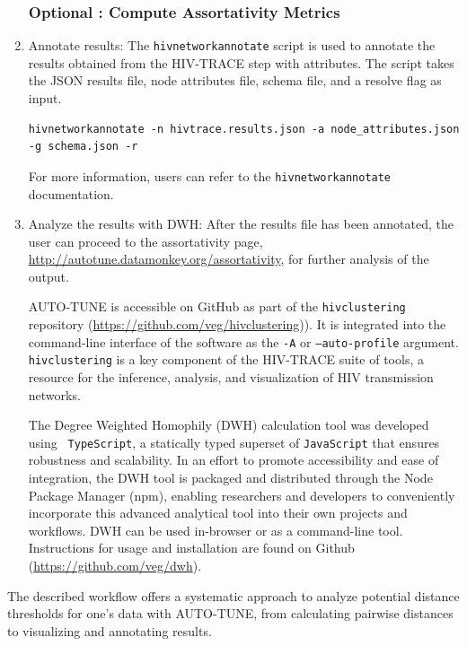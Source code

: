 \documentclass[utf8]{FrontiersinHarvard} %
\newcommand{\TODO}[1]{{\color{red}{#1}}}
\begin{document}
\begin{enumerate}
	      \subsubsection{Optional : Compute Assortativity Metrics}

	      \item{ Annotate results: The {\tt hivnetworkannotate} script is used to annotate the results obtained from the HIV-TRACE step with attributes. The script takes the JSON results file, node attributes file, schema file, and a resolve flag as input.
	                  \begin{lstlisting}[style=BashInputStyle]
hivnetworkannotate -n hivtrace.results.json -a node_attributes.json -g schema.json -r
	\end{lstlisting}
	                  For more information, users can refer to the {\tt hivnetworkannotate}
	                  documentation.\TODO{SAR -- Reference} }

	      \item{ Analyze the results with DWH: After the results file has been annotated, the user can proceed to the assortativity page, \url{http://autotune.datamonkey.org/assortativity}, for further analysis of the output. }

	      AUTO-TUNE is accessible on GitHub as part of the {\tt hivclustering} repository
	      (\url{https://github.com/veg/hivclustering})). It is integrated into the
	      command-line interface of the software as the {\tt -A} or {\tt --auto-profile}
	      argument. {\tt hivclustering} is a key component of the HIV-TRACE suite of
	      tools, a resource for the inference, analysis, and visualization of HIV
	      transmission networks.

	      The Degree Weighted Homophily (DWH) calculation tool was developed using {\tt
			      TypeScript}, a statically typed superset of {\tt JavaScript} that ensures
	      robustness and scalability. In an effort to promote accessibility and ease of
	      integration, the DWH tool is packaged and distributed through the Node Package
	      Manager (npm), enabling researchers and developers to conveniently incorporate
	      this advanced analytical tool into their own projects and workflows. DWH can be
	      used in-browser or as a command-line tool. Instructions for usage and
	      installation are found on Github (\url{https://github.com/veg/dwh}).

\end{enumerate}

The described workflow offers a systematic approach to analyze potential
distance thresholds for one's data with AUTO-TUNE, from calculating pairwise
distances to visualizing and annotating results.
\end{document}
